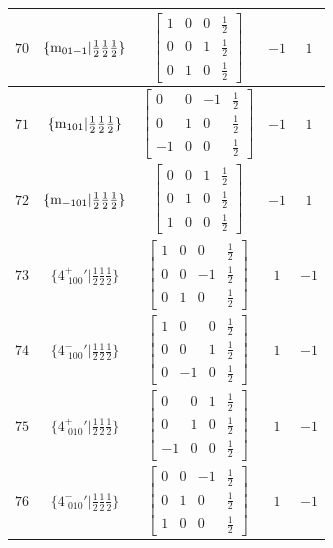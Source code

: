 \documentclass[fleqn,8pt]{jsarticle}
\begin{document}
\begin{longtable}{ccccc}
$ 70 $ & $ \{{\rm m}_{01-1}|\frac{1}{2} \frac{1}{2} \frac{1}{2}\} $ & $ \begin{bmatrix} 1 & 0 & 0 & \frac{1}{2} \\ 0 & 0 & 1 & \frac{1}{2} \\ 0 & 1 & 0 & \frac{1}{2} \end{bmatrix} $ & $ -1 $ & $ 1 $ \\ \hline
$ 71 $ & $ \{{\rm m}_{101}|\frac{1}{2} \frac{1}{2} \frac{1}{2}\} $ & $ \begin{bmatrix} 0 & 0 & -1 & \frac{1}{2} \\ 0 & 1 & 0 & \frac{1}{2} \\ -1 & 0 & 0 & \frac{1}{2} \end{bmatrix} $ & $ -1 $ & $ 1 $ \\ \hline
$ 72 $ & $ \{{\rm m}_{-101}|\frac{1}{2} \frac{1}{2} \frac{1}{2}\} $ & $ \begin{bmatrix} 0 & 0 & 1 & \frac{1}{2} \\ 0 & 1 & 0 & \frac{1}{2} \\ 1 & 0 & 0 & \frac{1}{2} \end{bmatrix} $ & $ -1 $ & $ 1 $ \\ \hline
$ 73 $ & $ \{4^{+}_{\,\,100}{}'|\frac{1}{2} \frac{1}{2} \frac{1}{2}\} $ & $ \begin{bmatrix} 1 & 0 & 0 & \frac{1}{2} \\ 0 & 0 & -1 & \frac{1}{2} \\ 0 & 1 & 0 & \frac{1}{2} \end{bmatrix} $ & $ 1 $ & $ -1 $ \\ \hline
$ 74 $ & $ \{4^{-}_{\,\,100}{}'|\frac{1}{2} \frac{1}{2} \frac{1}{2}\} $ & $ \begin{bmatrix} 1 & 0 & 0 & \frac{1}{2} \\ 0 & 0 & 1 & \frac{1}{2} \\ 0 & -1 & 0 & \frac{1}{2} \end{bmatrix} $ & $ 1 $ & $ -1 $ \\ \hline
$ 75 $ & $ \{4^{+}_{\,\,010}{}'|\frac{1}{2} \frac{1}{2} \frac{1}{2}\} $ & $ \begin{bmatrix} 0 & 0 & 1 & \frac{1}{2} \\ 0 & 1 & 0 & \frac{1}{2} \\ -1 & 0 & 0 & \frac{1}{2} \end{bmatrix} $ & $ 1 $ & $ -1 $ \\ \hline
$ 76 $ & $ \{4^{-}_{\,\,010}{}'|\frac{1}{2} \frac{1}{2} \frac{1}{2}\} $ & $ \begin{bmatrix} 0 & 0 & -1 & \frac{1}{2} \\ 0 & 1 & 0 & \frac{1}{2} \\ 1 & 0 & 0 & \frac{1}{2} \end{bmatrix} $ & $ 1 $ & $ -1 $ \\ \hline

\end{longtable}
\end{document}
